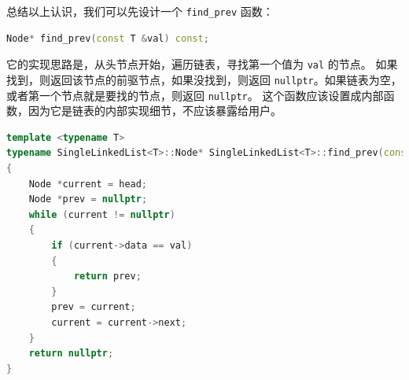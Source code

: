 \documentclass[a4paper]{ctexart}
\theoremstyle{definition}
\theoremstyle{definition}
\begin{document}
总结以上认识，我们可以先设计一个 \verb|find_prev| 函数：
\begin{lstlisting}[language=c++]
Node* find_prev(const T &val) const;
\end{lstlisting}
它的实现思路是，从头节点开始，遍历链表，寻找第一个值为 \verb|val| 的节点。
如果找到，则返回该节点的前驱节点，如果没找到，则返回 \verb|nullptr|。如果链表为空，或者第一个节点就是要找的节点，则返回 \verb|nullptr|。
这个函数应该设置成内部函数，因为它是链表的内部实现细节，不应该暴露给用户。
\begin{lstlisting}[language=c++]
template <typename T>
typename SingleLinkedList<T>::Node* SingleLinkedList<T>::find_prev(const T &val) const
{
    Node *current = head;
    Node *prev = nullptr;
    while (current != nullptr)
    {
        if (current->data == val)
        {
            return prev;
        }
        prev = current;
        current = current->next;
    }
    return nullptr;
}
\end{lstlisting}
\end{document}
